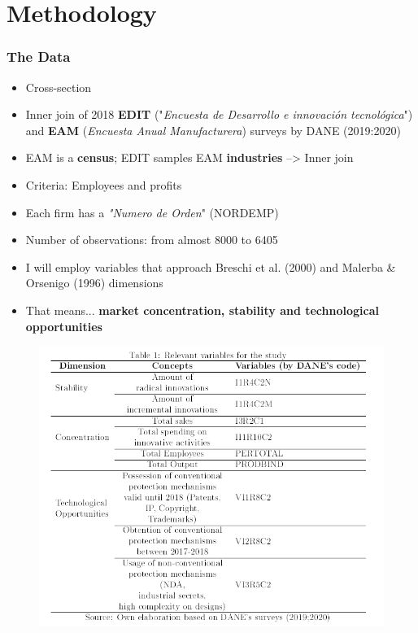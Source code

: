 \documentclass{beamer}
\begin{document}
\section{Methodology}
	\begin{frame}[allowframebreaks]
	\frametitle{The Data}
	\begin{itemize}
		\item Cross-section
		\item Inner join of 2018 \textbf{EDIT} ("\textit{Encuesta de Desarrollo
		e innovación tecnológica}") and \textbf{EAM} (\textit{Encuesta Anual Manufacturera}) surveys by DANE (2019:2020)
		\item EAM is a \textbf{census}; EDIT samples EAM \textbf{industries} --> Inner join
		\item Criteria: Employees and profits
		\item Each firm has a \textit{"Numero de Orden}" (NORDEMP)
	\end{itemize}
	\pagebreak
	\begin{itemize}
		\item Number of observations: from almost 8000 to 6405
		\item I will employ variables that approach Breschi et al.
		(2000) and Malerba \& Orsenigo (1996) dimensions
		\item That means... \textbf{market concentration, stability and
		technological opportunities}
	\end{itemize}
	\framebreak
	\end{frame}
	\begin{frame}
	\begin{figure}
		\centering
		\includegraphics[scale=0.51]{table1.png}	
	\end{figure}
	\end{frame}
	
\end{document}
